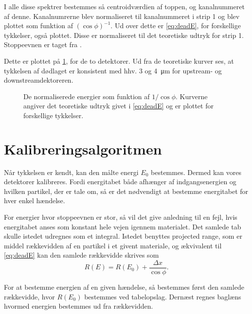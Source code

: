 I alle disse spektrer bestemmes så centroidværdien af \Pu toppen, og kanalnummeret af denne.
Kanalnumrerne blev normaliseret til kanalnummeret i strip 1 og blev plottet som funktion af
$(\cos \phi)^{-1}$. Ud over dette er \cref{eq:deadE}, for forskellige tykkelser, også plottet. Disse er
normaliseret til det teoretiske udtryk for strip 1. Stoppeevnen er taget fra \cite{Ziegler}.

Dette er plottet på \cref{fig:dead}, for de to detektorer. Ud fra de teoretiske kurver ses, at tykkelsen
af dødlaget er konsistent med hhv. 3 og \SI{4}{\um} for upstream- og downstreamdektoreren.

\begin{figure}[b]
  \centering
  \hfill
  \caption{De normaliserede energier som funktion af $1/\cos\phi$. Kurverne angiver det teoretiske
    udtryk givet i \cref{eq:deadE} og er plottet for forskellige tykkelser.}
  \label{fig:dead}
\end{figure}


\section{Kalibreringsalgoritmen}
\label{sec:kalalgo}

Når tykkelsen er kendt, kan den målte energi $E_{0}$ bestemmes. Dermed kan vores detektorer
kalibreres. Fordi energitabet både afhænger af indgangsenergien og hvilken partikel, der er tale
om, så er det nødvendigt at bestemme energitabet for hver enkel hændelse.

For energier hvor stoppeevnen er stor, så vil det give anledning til en fejl, hvis energitabet anses
som konstant hele vejen igennem materialet. Det samlede tab skulle istedet udregnes som et
integral. Istedet benyttes projected range, som er middel rækkevidden af en partikel i et givent
materiale, og ækvivalent til \cref{eq:deadE} kan den samlede rækkevidde skrives som
\begin{equation}
  \label{eq:deadR}
  R(E) = R(E_{0}) + \frac{\Delta x}{\cos \phi} .
\end{equation}

For at bestemme energien af en given hændelse, så bestemmes først den samlede rækkevidde, hvor
$R(E_{0})$ bestemmes ved tabelopslag. Dernæst regnes baglæns hvormed energien bestemmes ud fra
rækkevidden. 











